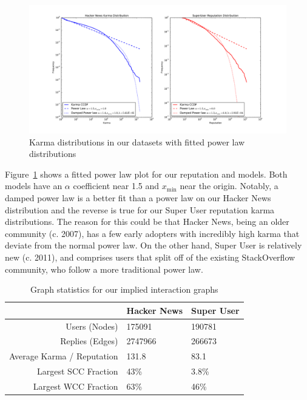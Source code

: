 \documentclass[11pt]{article}
\begin{document}
\begin{figure}[t]
\centering
\includegraphics[width=0.95\linewidth]{powerlaws}
\caption{Karma distributions in our datasets with fitted power law distributions}
\label{fig:powerlaws}
\end{figure}

Figure~\ref{fig:powerlaws} shows a fitted power law plot for our reputation and
models. Both models have an $\alpha$ coefficient near 1.5 and $x_{\text{min}}$
near the origin. Notably, a damped power law is a better fit than a power law on
our Hacker News distribution and the reverse is true for our Super User
reputation karma distributions. The reason for this could be that Hacker News,
being an older community (c. 2007), has a few early adopters with incredibly
high karma that deviate from the normal power law. On the other hand, Super User
is relatively new (c. 2011), and comprises users that split off of the existing
StackOverflow community, who follow a more traditional power law.

\begin{table}[t]
\begin{center}
\begin{tabular}{| r | l l |}
\hline
& \textbf{Hacker News} & \textbf{Super User} \\
\hline
Users (Nodes) & 175091 & 190781 \\
Replies (Edges) & 2747966 & 266673 \\
Average Karma / Reputation & 131.8 & 83.1 \\
Largest SCC Fraction & 43\% & 3.8\% \\
Largest WCC Fraction & 63\% & 46\% \\
\hline
\end{tabular}
\end{center}
\caption{Graph statistics for our implied interaction graphs}
\label{tab:graphstats}
\end{table}
\end{document}
